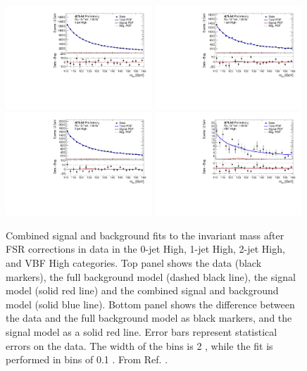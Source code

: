 \begin{figure}[h!]
  \centering
  \includegraphics[width=0.49\textwidth]{figures/hmumu/fits/BDT10}
  \includegraphics[width=0.49\textwidth]{figures/hmumu/fits/BDT7}
  \includegraphics[width=0.49\textwidth]{figures/hmumu/fits/BDT4}
  \includegraphics[width=0.49\textwidth]{figures/hmumu/fits/BDT1}
  \caption[Combined signal and background fit to data for High categories]{
  Combined signal and background fits to the invariant mass after FSR
  corrections in data in the 0-jet High, 1-jet High, 2-jet High,
  and VBF High categories. Top panel shows the data (black
  markers), the full background model (dashed black line), the signal
  model (solid red line) and the combined signal and background model
  (solid blue line). Bottom panel shows the difference between the data
  and the full background model as black markers, and the signal model
  as a solid red line. Error bars represent statistical errors on
  the data. The width of the bins is 2 \GeV, while the fit is
  performed in bins of 0.1 \GeV.
  From Ref. \cite{ATLAS-CONF-2019-028}.
  }
  \label{fig:hmumu:fit-high}
\end{figure}


